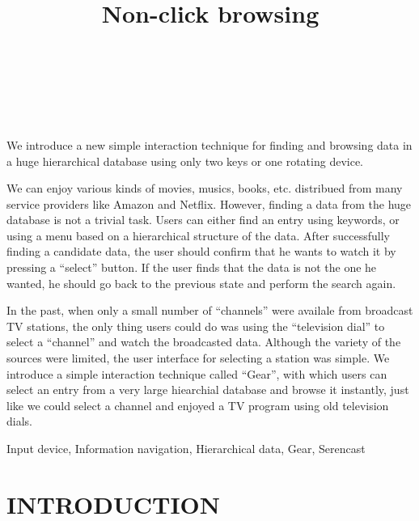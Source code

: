 \documentclass{article}
\begin{document}
\title{Non-click browsing}
\author{
\begin{tabular}{l}
\parbox{5.5cm}{
\begin{center}
~ \\
~ \\
~
\end{center}
}
\end{tabular}
}
\maketitle
\abstract

We introduce a new simple interaction technique for finding and browsing
data in a huge hierarchical database using only two keys or
one rotating device.

We can enjoy various kinds of movies, musics, books,
etc. distribued from many service providers like Amazon and Netflix.
However, 
finding a data from the huge database is not a trivial task. Users can
either find an entry using keywords, or using a menu based
on a hierarchical structure of the data.
After successfully finding a candidate data,
the user should confirm that he wants to watch it by pressing a ``select'' button.
If the user finds that the data is not the one he wanted,
he should go back to the previous state and perform the search again.

In the past, when only a small number of ``channels'' were availale
from broadcast TV stations, the only thing users could do was
using the ``television dial'' to select a ``channel'' and watch the
broadcasted data.
Although the variety of the sources were limited,
the user interface for selecting a station was simple.
%
We introduce a simple interaction technique called ``Gear'',
with which users can select an entry from a very large hiearchial database and
browse it instantly, just like we could select a channel and enjoyed a TV program
using old television dials.

\keywords Input device, Information navigation, Hierarchical data, Gear, Serencast


\section*{INTRODUCTION}
\end{document}
